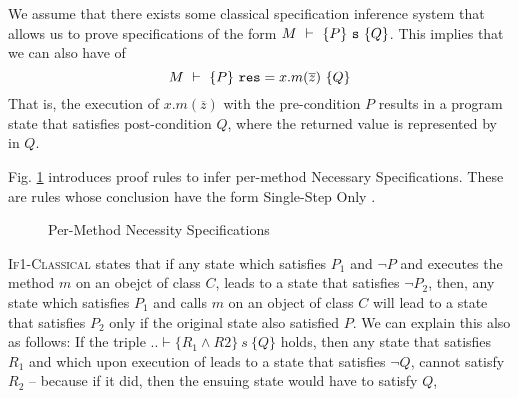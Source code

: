 We assume that there exists some classical specification
inference system  that allows us to prove 
specifications of the form  $M\ \vdash\ \{P\}\ {\texttt{s}}\ \{Q\}$. 
This implies that we can also have  of  
$$M\ \vdash\ \hoare{P}{\prg{res} = x.m(\overline{z})}{Q}$$
That is,   %
 the execution of $x.m(\overline{z})$ 
with the pre-condition $P$ results in a program state that 
satisfies post-condition $Q$, where the returned value is represented
by  in $Q$.

Fig. \ref{f:classical->singlestep} introduces  %
proof rules to infer per-method Necessary Specifications.
These are rules whose conclusion have the  form Single-Step Only . 

\begin{figure}[t]
\footnotesize
{}
\caption{Per-Method Necessity Specifications}
\label{f:classical->singlestep}
\end{figure}

 

 \textsc{If1-Classical} states that  
if any state which satisfies $P_1$ and $\neg P$ and executes  the method $m$ on an obejct of class $C$, leads to a state that satisfies $\neg P_2$, then, any state which satisfies $P_1$ and calls $m$ on an object of class $C$ will lead to a state that satisfies $P_2$ only if the original state also satisfied $P$.
We can explain this also as follows: If the triple $.. \vdash \{R_1 \wedge R2\}\ s\ \{Q\}$ holds, then any state that satisfies $R_1$ and which upon execution of  leads to a state that satisfies $\neg Q$, cannot satisfy $R_2$ -- because  if it did, then the ensuing state would have to satisfy $Q$,
 


